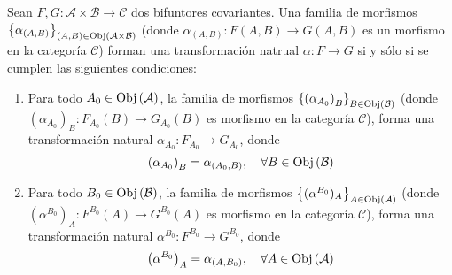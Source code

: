 \documentclass[12pt]{report}
\theoremstyle{largebreak}
\newcommand\cf[3]{\ensuremath{#1:#2\rightarrow#3}}
\newcommand{\Obj}[1]{\ensuremath{\textup{Obj}\left(#1\right)}}
\begin{document}
    \begin{propo}
        Sean $\cf{F,G}{\mathcal{A}\times\mathcal{B}}{\mathcal{C}}$ dos bifuntores covariantes. Una familia de morfismos $\left\{\alpha_{(A,B)} \right\}_{(A,B)\in\Obj{\mathcal{A}\times\mathcal{B}}}$ (donde $\cf{\alpha_{(A,B)}}{F(A,B)}{G(A,B)}$ es un morfismo en la categoría $\mathcal{C}$) forman una transformación natrual $\cf{\alpha}{F}{G}$ si y sólo si se cumplen las siguientes condiciones:
        \begin{enumerate}
            \item Para todo $A_0\in\Obj{\mathcal{A}}$, la familia de morfismos $\left\{\left(\alpha_{A_0}\right)_B \right\}_{B\in\Obj{\mathcal{B}}}$ (donde $\cf{\left(\alpha_{A_0}\right)_B}{F_{A_0}(B)}{G_{A_0}(B)}$ es morfismo en la categoría $\mathcal{C}$), forma una transformación natural $\cf{\alpha_{ A_0}}{F_{A_0}}{G_{A_0}}$, donde
            \begin{equation*}
                \left(\alpha_{A_0}\right)_B=\alpha_{(A_0,B)},\quad\forall B\in\Obj{\mathcal{B}}
            \end{equation*}
            \item Para todo $B_0\in\Obj{\mathcal{B}}$, la familia de morfismos $\left\{(\alpha^{ B_0})_A \right\}_{ A\in\Obj{\mathcal{A}}}$ (donde $\cf{\left(\alpha^{B_0}\right)_A}{F^{B_0}(A)}{G^{B_0}(A)}$ es morfismo en la categoría $\mathcal{C}$), forma una transformación natural $\cf{\alpha^{ B_0}}{F^{B_0}}{G^{B_0}}$, donde
            \begin{equation*}
                \left(\alpha^{B_0}\right)_A=\alpha_{(A,B_0)},\quad\forall A\in\Obj{\mathcal{A}}
            \end{equation*}
        \end{enumerate}
    \end{propo}
\end{document}
